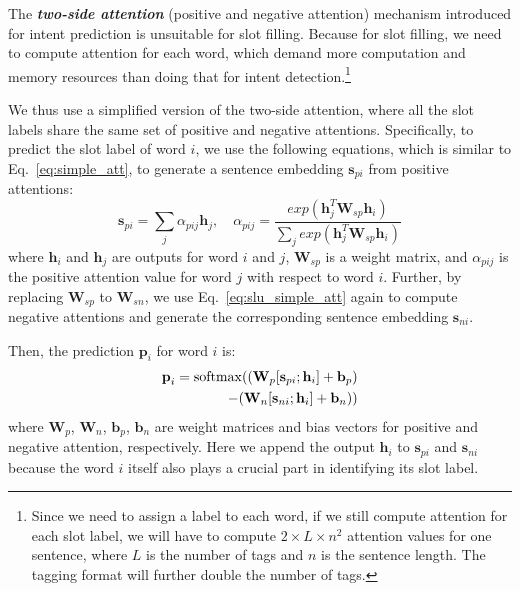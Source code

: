 The \textbf{\emph{two-side attention}} (positive and negative attention) mechanism introduced for intent prediction is unsuitable for slot
filling. Because for slot filling, we need to compute attention for each word, which demand more computation
and memory resources than doing that for intent detection.\footnote{Since we need to assign a label to each word, if we still compute
attention for each slot label, we will have to compute $2\times L \times n^2$ attention values for one sentence, where $L$ is the number of
tags and $n$ is the sentence length. The \BIO tagging format will further double the number of tags.}

We thus use a simplified version of the two-side attention, where all the slot labels share the same set of positive and negative attentions.
Specifically, to predict the slot label of word $i$, we use the following equations, which is similar to Eq.~\ref{eq:simple_att}, to generate a sentence embedding $\textbf{s}_{pi}$ from positive attentions:
\begin{equation}
\textbf{s}_{pi} = \sum_{j}{\alpha_{pij}\textbf{h}_j}, \quad \alpha_{pij}=\frac{exp(\textbf{h}_j^T\textbf{W}_{sp}\textbf{h}_i)}{\sum_{j}{exp(\textbf{h}_j^T\textbf{W}_{sp}\textbf{h}_i)}}
\label{eq:slu_simple_att}
\end{equation}
where $\textbf{h}_i$ and $\textbf{h}_j$ are \BLSTM outputs for word $i$ and $j$, $\textbf{W}_{sp}$ is a weight matrix, and $\alpha_{pij}$ is the positive attention value for word $j$ with respect to word $i$.
Further, by replacing $\textbf{W}_{sp}$ to $\textbf{W}_{sn}$, we use  Eq.~\ref{eq:slu_simple_att} again to compute negative attentions and generate the corresponding sentence embedding $\textbf{s}_{ni}$.

Then, the prediction $\textbf{p}_i$ for word $i$ is:
\begin{equation}
\begin{split}
\textbf{p}_i = \operatorname{softmax}((\textbf{W}_p [\textbf{s}_{pi}; \textbf{h}_i] + \textbf{b}_p) \\- (\textbf{W}_n [\textbf{s}_{ni}; \textbf{h}_i] + \textbf{b}_n))
\end{split}
\end{equation}
where $\textbf{W}_{p}$, $\textbf{W}_{n}$, $\textbf{b}_{p}$, $\textbf{b}_{n}$ are weight matrices and bias vectors for positive and negative attention, respectively. Here we append the \BLSTM output $\textbf{h}_i$ to $\textbf{s}_{pi}$ and $\textbf{s}_{ni}$ because the word $i$ itself also plays a crucial part in identifying its slot label.

